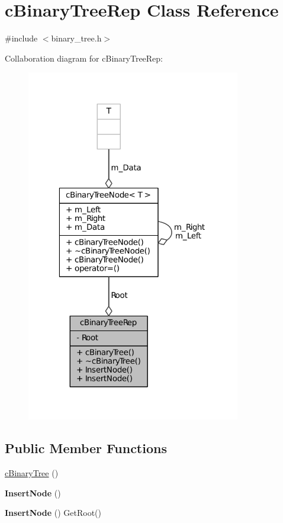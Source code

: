 \hypertarget{classcBinaryTreeRep}{
\section{c\-Binary\-Tree\-Rep \-Class \-Reference}
\label{classcBinaryTreeRep}
}


{\ttfamily \#include $<$binary\-\_\-tree.\-h$>$}



\-Collaboration diagram for c\-Binary\-Tree\-Rep\-:
\nopagebreak
\begin{figure}[H]
\begin{center}
\leavevmode
\includegraphics[width=265pt]{classcBinaryTreeRep__coll__graph}
\end{center}
\end{figure}
\subsection*{\-Public \-Member \-Functions}
\begin{DoxyCompactItemize}
\item 
\hyperlink{classcBinaryTreeRep_ad2cac2b5d3648b1f11669d579e790ba3}{c\-Binary\-Tree} ()
\item 
\hypertarget{classcBinaryTreeRep_a295b4a582388abcfb65b312a00db2d3e}{
{\bfseries \-Insert\-Node} ()}
\label{classcBinaryTreeRep_a295b4a582388abcfb65b312a00db2d3e}

\item 
\hypertarget{classcBinaryTreeRep_a9ebebfad24bcf4cbdf88003d0f42c1f6}{
{\bfseries \-Insert\-Node} () \-Get\-Root()}
\label{classcBinaryTreeRep_a9ebebfad24bcf4cbdf88003d0f42c1f6}

\end{DoxyCompactItemize}
